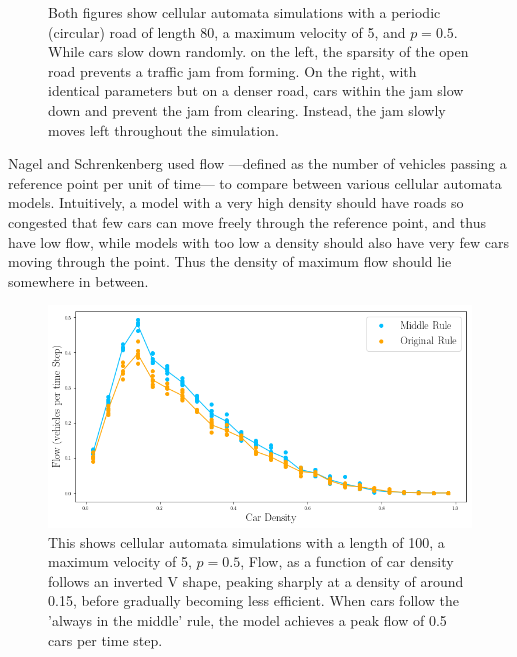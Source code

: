 \documentclass{article}
\begin{document}
\begin{figure}[h]
\begin{minipage}[t]{.5\textwidth}
\end{minipage}

\caption{Both figures show cellular automata simulations with a periodic (circular) road of length 80, a maximum velocity of 5, and $p = 0.5$. While cars slow down randomly. on the left, the sparsity of the open road prevents a traffic jam from forming. On the right, with identical parameters but on a denser road, cars within the jam slow down and prevent the jam from clearing. Instead, the jam slowly moves left throughout the simulation.}
\end{figure}

Nagel and Schrenkenberg used flow ---defined as the number of vehicles passing a reference point per unit of time--- to compare between various cellular automata models. Intuitively, a model with a very high density should have roads so congested that few cars can move freely through the reference point, and thus have low flow, while models with too low a density should also have very few cars moving through the point. Thus the density of maximum flow should lie somewhere in between.

\begin{figure}
\centering
\includegraphics[scale = 0.6]{middleorig.png}
\caption{This shows cellular automata simulations with a length of 100, a maximum velocity of 5, $p = 0.5$, Flow, as a function of car density follows an inverted V shape, peaking sharply at a density of around 0.15, before gradually becoming less efficient. When cars follow the 'always in the middle' rule, the model achieves a peak flow of 0.5 cars per time step.}
\end{figure}

\end{document}
